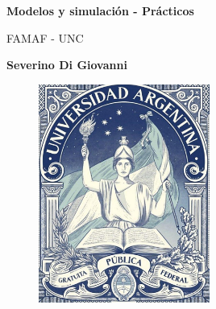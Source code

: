 \documentclass[article, 12pt]{article}
\begin{document}
\begin{titlepage}
   \begin{center}
       \vspace*{1cm}

       \Huge
       \textbf{Modelos y simulación - Prácticos}

       \vspace{0.5cm}
        FAMAF - UNC
            
       \vspace{1.5cm}
       \large
       \textbf{Severino Di Giovanni}
       \normalsize


       \vspace{5.0cm}
       \begin{figure}[h!]
       \centering
        \includegraphics[width=0.5\textwidth]{../Images/UPA.jpg}
       \end{figure}

       \vfill
            
            
     
   \end{center}
\end{titlepage}


\shipout\null
\end{document}
